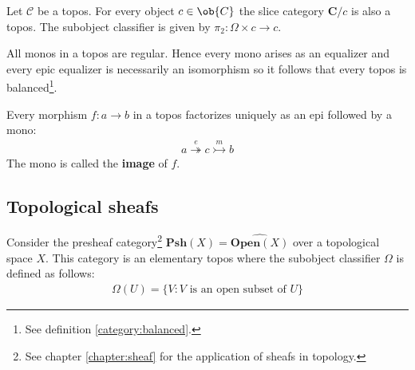 	\begin{property}
		Let $\mathcal{C}$ be a topos. For every object $c\in\ob{C}$ the slice category $\mathbf{C}/c$ is also a topos. The subobject classifier is given by $\pi_2:\Omega\times c\rightarrow c$.
	\end{property}
	
	\begin{property}[Balanced]
		All monos in a topos are regular. Hence every mono arises as an equalizer and every epic equalizer is necessarily an isomorphism so it follows that every topos is balanced\footnote{See definition \ref{category:balanced}.}.
	\end{property}
	
	\begin{property}
		Every morphism $f:a\rightarrow b$ in a topos factorizes uniquely as an epi followed by a mono:
		\begin{gather}
			a\overset{e}{\twoheadrightarrow} c\overset{m}{\rightarrowtail} b
		\end{gather}
		The mono is called the \textbf{image} of $f$.
	\end{property}

\subsection{Topological sheafs}

	\begin{property}\label{topoi:sheaf_topos}
		Consider the presheaf category\footnote{See chapter \ref{chapter:sheaf} for the application of sheafs in topology.} $\textbf{Psh}(X) = \widehat{\textbf{Open}(X)}$ over a topological space $X$. This category is an elementary topos where the subobject classifier $\Omega$ is defined as follows:
		\begin{gather}
			\Omega(U) = \{V:V\text{ is an open subset of }U\}
		\end{gather}
	\end{property}
	
